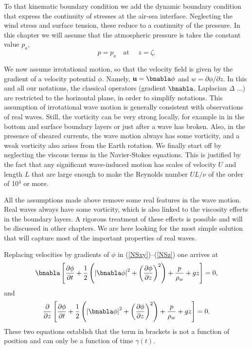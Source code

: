 To that kinematic boundary condition we add the dynamic boundary condition that express the continuity of 
stresses at the air-sea interface. Neglecting the wind stress and surface tension, these reduce to a continuity of 
the pressure. In this chapter we will assume that the atmospheric pressure is takes the constant value  $p_a$,
\begin{equation}
    p=p_a\quad \mbox{at\ }\quad z=\zeta.
\end{equation}

We now assume irrotational motion, so that the velocity field 
is given by the gradient of a velocity potential 
$\phi$. Namely, $ {\mathbf u} = \bnabla \phi$ and $w={\partial
\phi}/{\partial z}$. In this and all our notations, the classical operators  (gradient
$\bnabla$, Laplacian $\Delta$ ...) are restricted to the horizontal 
plane, in order to simplify notations. This assumption of irrotational wave motion
is generally consistent with observations of real waves. Still, the vorticity can be 
very strong locally, for example in in the bottom and surface boundary layers
or just after a wave has broken. Also, in the presence of sheared currents, the wave motion always has 
some vorticity, and a weak vorticity also arises from the Earth rotation. 
We finally start off by neglecting the viscous terms in the Navier-Stokes equations. This is justified by the 
fact that any significant 
wave-induced motion has scales of velocity $U$ and length $L$ that are large enough to 
make the Reynolds number $UL/\nu$ of the order of  10$^4$ or more.

All the assumptions made above remove some real features in the wave motion. 
Real waves always have some vorticity, which is also linked to the viscosity 
effects in the boundary layers. A rigorous treatment of these effects is possible 
and will be discussed in other chapters. We are here looking for the most 
simple solution that will capture most of the important properties of real waves. 


Replacing velocities by gradients of $\phi$ in
(\ref{NSxy})--(\ref{NSz}) one arrives at
\begin{equation}
    \bnabla \left[\frac{\partial \phi}{\partial t}
    +\frac{1}{2}\left(
    \left|\bnabla \phi\right|^2
    +\left(\frac{\partial \phi}{\partial z}\right)^2
    \right)
    +\frac{p}{\rho_w}+gz \right]=0,
\end{equation}
and
\begin{equation}
    \frac{\partial}{\partial z} \left[\frac{\partial \phi}{\partial t}
    +\frac{1}{2}\left(
    \left|\bnabla \phi\right|^2
    +\left(\frac{\partial \phi}{\partial z}\right)^2
    \right)
    +\frac{p}{\rho_w}+gz \right]=0.\label{eq:NStoBer}
\end{equation}
These two equations establish that the term in brackets is not a function of position and can 
only be a function of time $\gamma(t)$. 

